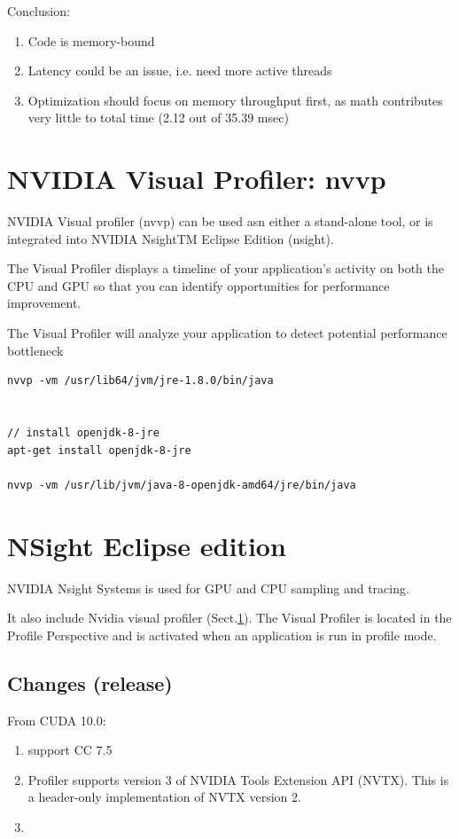 Conclusion: 
\begin{enumerate}
\item Code is memory-bound
\item Latency could be an issue, i.e. need more active threads 
\item Optimization should focus on memory throughput first, as math
  contributes very little to total time (2.12 out of 35.39 msec)
\end{enumerate}


\section{NVIDIA Visual Profiler: nvvp}
\label{sec:nvvp}

NVIDIA Visual profiler (nvvp) can be used asn either a stand-alone tool, or is
integrated into NVIDIA NsightTM Eclipse Edition (nsight).

The Visual Profiler displays a timeline of your application's activity on both
the CPU and GPU so that you can identify opportunities for performance
improvement.

The Visual Profiler will analyze your application to detect potential performance bottleneck

\begin{verbatim}
nvvp -vm /usr/lib64/jvm/jre-1.8.0/bin/java


// install openjdk-8-jre 
apt-get install openjdk-8-jre

nvvp -vm /usr/lib/jvm/java-8-openjdk-amd64/jre/bin/java
\end{verbatim}

\section{NSight Eclipse edition}
\label{sec:nsight}

NVIDIA Nsight Systems is used for GPU and CPU sampling and tracing.

It also include Nvidia visual profiler (Sect.\ref{sec:nvvp}).
The Visual Profiler is located in the Profile Perspective and is activated when
an application is run in profile mode.


\subsection{Changes (release)}

From CUDA 10.0:
\begin{enumerate}
  \item support CC 7.5
  
  \item Profiler supports version 3 of NVIDIA Tools Extension API (NVTX). This
  is a header-only implementation of NVTX version 2.
  
  \item 
\end{enumerate}

